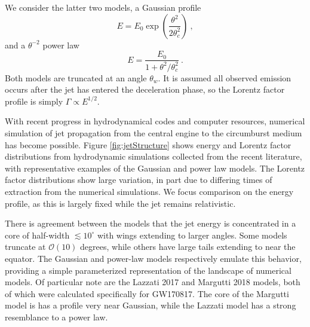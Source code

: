 \documentclass[modern]{aastex62}
\begin{document}
We consider the latter two models, a Gaussian profile
\begin{equation}
	E = E_0 \exp\left( \frac{\theta^2 }{2 \theta_c^2}\right)\ , \label{eq:Gaussian}
\end{equation}
and a $\theta^{-2}$ power law
\begin{equation}
	E = \frac{E_0}{1 + \theta^2/\theta_c^2}\ . \label{eq:powerlaw}
\end{equation}
Both models are truncated at an angle $\theta_w$. It is assumed all observed emission occurs after the jet has entered the deceleration phase, so the Lorentz factor profile is simply $\Gamma \propto E^{1/2}$.

With recent progress in hydrodynamical codes and computer resources, numerical simulation of jet propagation from the central engine to the circumburst medium has become possible.  Figure \ref{fig:jetStructure} shows energy and Lorentz factor distributions from hydrodynamic simulations collected from the recent literature, with representative examples of the Gaussian and power law models. The Lorentz factor distributions show large variation, in part due to differing times of extraction from the numerical simulations.  We focus comparison on the energy profile, as this is largely fixed while the jet remains relativistic. 

\begin{figure}
\end{figure}

There is agreement between the models that the jet energy is concentrated in a core of half-width $\lesssim 10^\circ$ with wings extending to larger angles.  Some models truncate at $\mathcal{O}(10)$ degrees, while others have large tails extending to near the equator.  The Gaussian and power-law models respectively emulate this behavior, providing a simple parameterized representation of the landscape of numerical models.  Of particular note are the Lazzati 2017 and Margutti 2018 models, both of which were calculated specifically for GW170817. The core of the Margutti model is has a profile very near Gaussian, while the Lazzati model has a strong resemblance to a power law.  
\end{document}
